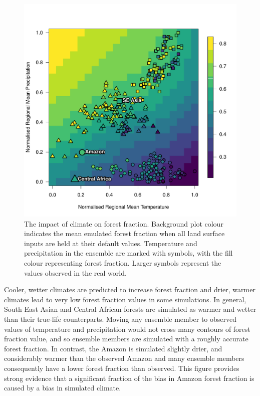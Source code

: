 \documentclass[gmd, manuscript]{copernicus}
\begin{document}
\begin{figure}[t]
\includegraphics[width=12cm]{../graphics/taat_temp_precip_quilt.pdf}
\caption{The impact of climate on forest fraction. Background plot colour indicates the mean emulated forest fraction when all land surface inputs are held at their default values. Temperature and precipitation in the ensemble are marked with symbols, with the fill colour representing forest fraction. Larger symbols represent the values observed in the real world.
}
\label{fig:taat_temp_precip_quilt}
\end{figure}

Cooler, wetter climates are predicted to increase forest fraction and drier, warmer climates lead to very low forest fraction values in some simulations. In general, South East Asian and Central African forests are simulated as warmer and wetter than their true-life counterparts. Moving any ensemble member to observed values of temperature and precipitation would not cross many contours of forest fraction value, and so ensemble members are simulated with a roughly accurate forest fraction. In contrast, the Amazon is simulated slightly drier, and considerably warmer than the observed Amazon and many ensemble members consequently have a lower forest fraction than observed. This figure provides strong evidence that a significant fraction of the bias in Amazon forest fraction is caused by a bias in simulated climate.
\end{document}
